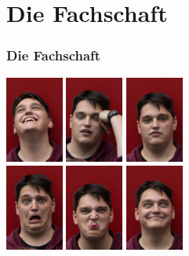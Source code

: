 \documentclass{beamer}
\begin{document}
\section{Die Fachschaft}
\begin{frame}
\frametitle{Die Fachschaft}

\begin{center}
\pause
\includegraphics[width=1.9cm]{img/benni1.jpg}
\pause
\hspace{0.1cm}
\includegraphics[width=1.9cm]{img/benni2.jpg}
\pause
\hspace{0.1cm}
\includegraphics[width=1.9cm]{img/benni3.jpg}\\
\pause
\vspace{0.2cm}
\includegraphics[width=1.9cm]{img/benni4.jpg}
\pause
\hspace{0.1cm}
\includegraphics[width=1.9cm]{img/benni5.jpg}
\pause
\hspace{0.1cm}
\includegraphics[width=1.9cm]{img/benni6.jpg}
\vspace{0.1cm}


\end{center}
\end{frame}
\end{document}
